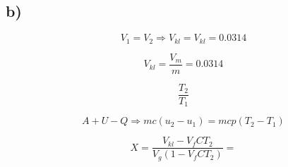 

\subsection*{b)}

\begin{equation*}
V_1 = V_2 \Rightarrow V_{kl} = V_{kl} = 0.0314
\end{equation*}

\begin{equation*}
V_{kl} = \frac{V_m}{m} = 0.0314
\end{equation*}

\begin{equation*}
\frac{T_2}{T_1}
\end{equation*}

\begin{equation*}
A + U - Q \Rightarrow m c (u_2 - u_1) = m c p (T_2 - T_1)
\end{equation*}

\begin{equation*}
X = \frac{V_{kl} - V_{f} C T_2}{V_{g} (1 - V_{f} C T_2)} =
\end{equation*}